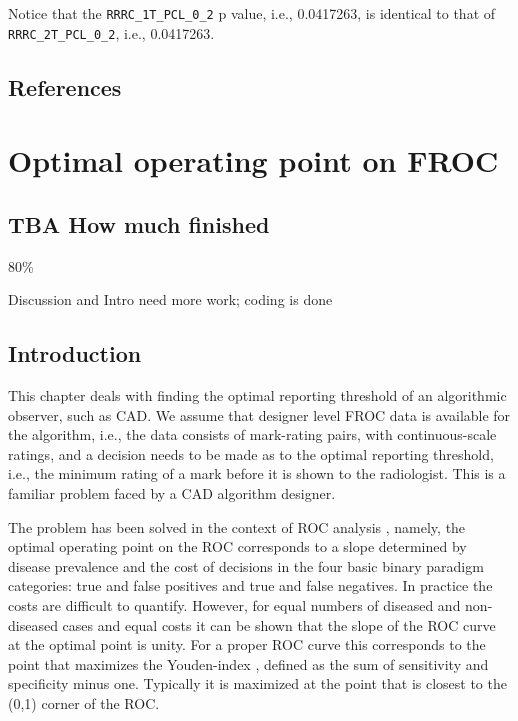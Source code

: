 \documentclass[
]{book}
\begin{document}
Notice that the \texttt{RRRC\_1T\_PCL\_0\_2} p value, i.e., 0.0417263, is identical to that of \texttt{RRRC\_2T\_PCL\_0\_2}, i.e., 0.0417263.

\hypertarget{standalone-cad-radiologists-references}{%
\section{References}\label{standalone-cad-radiologists-references}}

\hypertarget{optim-op-point}{%
\chapter{Optimal operating point on FROC}\label{optim-op-point}}

\hypertarget{optim-op-point-how-much-finished}{%
\section{TBA How much finished}\label{optim-op-point-how-much-finished}}

80\%

Discussion and Intro need more work; coding is done

\hypertarget{optim-op-point-intro}{%
\section{Introduction}\label{optim-op-point-intro}}

This chapter deals with finding the optimal reporting threshold of an algorithmic observer, such as CAD. We assume that designer level FROC data is available for the algorithm, i.e., the data consists of mark-rating pairs, with continuous-scale ratings, and a decision needs to be made as to the optimal reporting threshold, i.e., the minimum rating of a mark before it is shown to the radiologist. This is a familiar problem faced by a CAD algorithm designer.

The problem has been solved in the context of ROC analysis \citep{metz1978rocmethodology}, namely, the optimal operating point on the ROC corresponds to a slope determined by disease prevalence and the cost of decisions in the four basic binary paradigm categories: true and false positives and true and false negatives. In practice the costs are difficult to quantify. However, for equal numbers of diseased and non-diseased cases and equal costs it can be shown that the slope of the ROC curve at the optimal point is unity. For a proper ROC curve this corresponds to the point that maximizes the Youden-index \citep{youden1950index}, defined as the sum of sensitivity and specificity minus one. Typically it is maximized at the point that is closest to the (0,1) corner of the ROC.
\end{document}
